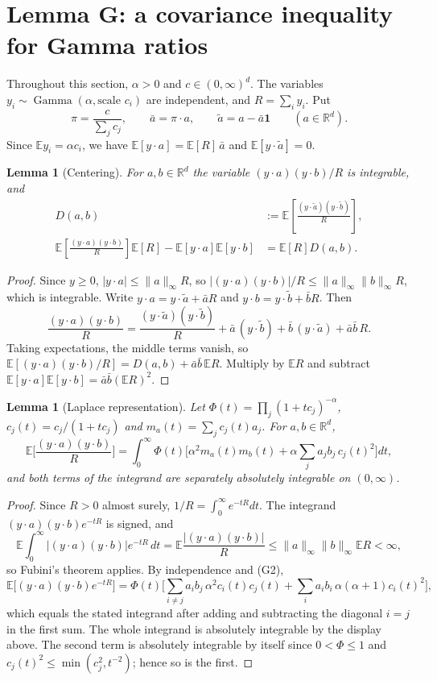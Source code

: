 \documentclass[11pt,a4paper]{article}
\newtheorem{lemma}[theorem]{Lemma}
\theoremstyle{definition}
\newcommand{\E}{\mathbb{E}}
\newcommand{\R}{\mathbb{R}}
\newcommand{\Gam}{\operatorname{Gamma}}
\begin{document}
\section{Lemma G: a covariance inequality for Gamma ratios}\label{sec:lemmaG}

Throughout this section, $\alpha>0$ and $c\in(0,\infty)^d$. The variables $y_i\sim\Gam(\alpha,\text{scale }c_i)$ are independent, and $R=\sum_i y_i$. Put
\[
\pi=\frac{c}{\sum_jc_j},\qquad \bar a=\pi\cdot a,\qquad \tilde a=a-\bar a\mathbf 1\qquad(a\in\R^d).
\]
Since $\E y_i=\alpha c_i$, we have $\E[y\cdot a]=\E[R]\,\bar a$ and $\E[y\cdot\tilde a]=0$.

\begin{lemma}[Centering]\label{lem:centering}
For $a,b\in\R^d$ the variable $(y\cdot a)(y\cdot b)/R$ is integrable, and
\[
\begin{aligned}
D(a,b)&:=\E\left[\frac{(y\cdot\tilde a)(y\cdot\tilde b)}R\right],\\
\E\left[\frac{(y\cdot a)(y\cdot b)}R\right]\E[R]
 -\E[y\cdot a]\E[y\cdot b]&=\E[R]D(a,b).
\end{aligned}
\]
\end{lemma}

\begin{proof}
Since $y\ge0$, $|y\cdot a|\le\|a\|_\infty R$, so $|(y\cdot a)(y\cdot b)|/R\le\|a\|_\infty\|b\|_\infty R$, which is integrable. Write $y\cdot a=y\cdot\tilde a+\bar aR$ and $y\cdot b=y\cdot\tilde b+\bar bR$. Then
\[
\frac{(y\cdot a)(y\cdot b)}R=\frac{(y\cdot\tilde a)(y\cdot\tilde b)}R+\bar a\,(y\cdot\tilde b)+\bar b\,(y\cdot\tilde a)+\bar a\bar b\,R .
\]
Taking expectations, the middle terms vanish, so $\E[(y\cdot a)(y\cdot b)/R]=D(a,b)+\bar a\bar b\,\E R$. Multiply by $\E R$ and subtract $\E[y\cdot a]\E[y\cdot b]=\bar a\bar b(\E R)^2$.
\end{proof}

\begin{lemma}[Laplace representation]\label{lem:laplace}
Let $\Phi(t)=\prod_j(1+tc_j)^{-\alpha}$, $c_j(t)=c_j/(1+tc_j)$ and $m_a(t)=\sum_jc_j(t)a_j$. For $a,b\in\R^d$,
\[
\E\Big[\frac{(y\cdot a)(y\cdot b)}R\Big]=\int_0^\infty\Phi(t)\Big[\alpha^2m_a(t)m_b(t)+\alpha\sum_ja_jb_j\,c_j(t)^2\Big]dt,
\]
and both terms of the integrand are separately absolutely integrable on $(0,\infty)$.
\end{lemma}

\begin{proof}
Since $R>0$ almost surely, $1/R=\int_0^\infty e^{-tR}dt$. The integrand $(y\cdot a)(y\cdot b)e^{-tR}$ is signed, and
\[
\E\int_0^\infty|(y\cdot a)(y\cdot b)|e^{-tR}\,dt=\E\frac{|(y\cdot a)(y\cdot b)|}R\le\|a\|_\infty\|b\|_\infty\E R<\infty,
\]
so Fubini's theorem applies. By independence and (G2),
\[
\E\big[(y\cdot a)(y\cdot b)e^{-tR}\big]=\Phi(t)\Big[\sum_{i\ne j}a_ib_j\,\alpha^2c_i(t)c_j(t)+\sum_ia_ib_i\,\alpha(\alpha+1)c_i(t)^2\Big],
\]
which equals the stated integrand after adding and subtracting the diagonal $i=j$ in the first sum. The whole integrand is absolutely integrable by the display above. The second term is absolutely integrable by itself since $0<\Phi\le1$ and $c_j(t)^2\le\min(c_j^2,t^{-2})$; hence so is the first.
\end{proof}
\end{document}
